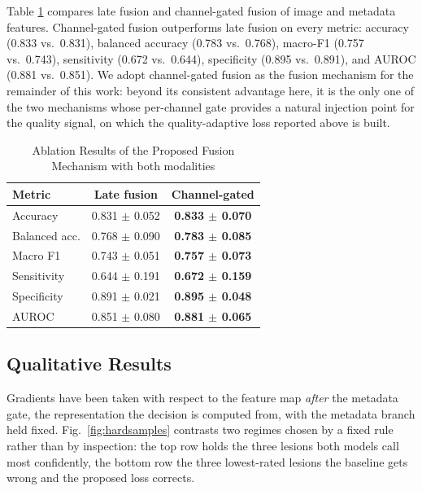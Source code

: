 \documentclass[conference]{IEEEtran}
\begin{document}
Table \ref{tab:ablation} compares late fusion and channel-gated fusion of image and metadata features. Channel-gated fusion outperforms late fusion on every metric: accuracy (0.833 vs.\ 0.831), balanced accuracy (0.783 vs.\ 0.768), macro-F1 (0.757 vs.\ 0.743), sensitivity (0.672 vs.\ 0.644), specificity (0.895 vs.\ 0.891), and AUROC (0.881 vs.\ 0.851). We adopt channel-gated fusion as the fusion mechanism for the remainder of this work: beyond its consistent advantage here, it is the only one of the two mechanisms whose per-channel gate provides a natural injection point for the quality signal, on which the quality-adaptive loss reported above is built.
\begin{table}[htbp]
\caption{Ablation Results of the Proposed Fusion Mechanism with both modalities}
\label{tab:ablation}
\centering
\scriptsize
\setlength{\tabcolsep}{2pt}
\begin{tabular}{|l|c|c|}
\hline
\textbf{Metric} & \textbf{Late fusion} & \textbf{Channel-gated} \\
\hline
Accuracy & 0.831 $\pm$ 0.052 & \textbf{0.833 $\pm$ 0.070} \\
Balanced acc. & 0.768 $\pm$ 0.090 & \textbf{0.783 $\pm$ 0.085} \\
Macro F1 & 0.743 $\pm$ 0.051 & \textbf{0.757 $\pm$ 0.073} \\
Sensitivity & 0.644 $\pm$ 0.191 & \textbf{0.672 $\pm$ 0.159} \\
Specificity & 0.891 $\pm$ 0.021 & \textbf{0.895 $\pm$ 0.048} \\
AUROC & 0.851 $\pm$ 0.080 & \textbf{0.881 $\pm$ 0.065} \\
\hline
\end{tabular}
\end{table}

\subsection{Qualitative Results} %
\label{sec:qualitative}
Gradients have been taken with respect to the feature map \emph{after} the metadata gate, the representation the decision is computed from, with the metadata branch held fixed. Fig.~\ref{fig:hardsamples} contrasts two regimes chosen by a fixed rule rather than by inspection: the top row holds the three lesions both models call most confidently, the bottom row the three lowest-rated lesions the baseline gets wrong and the proposed loss corrects.
\end{document}

